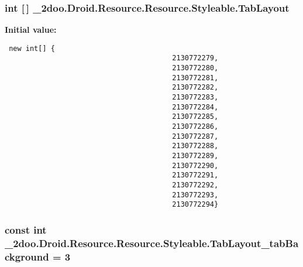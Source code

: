 \hypertarget{class__2doo_1_1_droid_1_1_resource_1_1_styleable_041b4c3cbc7f47c97f77a397055effec}{
\subsubsection[{TabLayout}]{\setlength{\rightskip}{0pt plus 5cm}int \mbox{[}$\,$\mbox{]} \_\-2doo.Droid.Resource.Resource.Styleable.TabLayout}}
\label{class__2doo_1_1_droid_1_1_resource_1_1_styleable_041b4c3cbc7f47c97f77a397055effec}


\textbf{Initial value:}

\begin{Code}\begin{verbatim} new int[] {
                                        2130772279,
                                        2130772280,
                                        2130772281,
                                        2130772282,
                                        2130772283,
                                        2130772284,
                                        2130772285,
                                        2130772286,
                                        2130772287,
                                        2130772288,
                                        2130772289,
                                        2130772290,
                                        2130772291,
                                        2130772292,
                                        2130772293,
                                        2130772294}
\end{verbatim}
\end{Code}
\hypertarget{class__2doo_1_1_droid_1_1_resource_1_1_styleable_364a6ede4f8ce8372da072956852c622}{
\subsubsection[{TabLayout\_\-tabBackground}]{\setlength{\rightskip}{0pt plus 5cm}const int \_\-2doo.Droid.Resource.Resource.Styleable.TabLayout\_\-tabBackground = 3}}
\label{class__2doo_1_1_droid_1_1_resource_1_1_styleable_364a6ede4f8ce8372da072956852c622}



